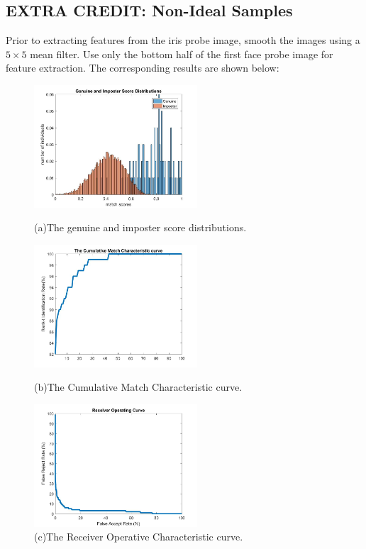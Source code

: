 \documentclass[a4paper]{article}
\begin{document}
\begin{spacing}{2.0}
\section*{\huge\textbf{ EXTRA CREDIT: Non-Ideal Samples}  }
	\normalsize  Prior to extracting features from the iris probe image, smooth the images using a $5\times 5$ mean filter. Use only the bottom half of the first face probe image for feature extraction. The corresponding results are shown below:
	\begin{figure}[H]
	\begin{minipage}[t]{0.3\linewidth}
	\centering
	\includegraphics[width=2.4in]{PartExtra3Dis.jpg}
	\caption{(a)The genuine and imposter score distributions.}
	\label{scoDis3}
	\end{minipage}
	\begin{minipage}[t]{0.3\linewidth}
	\centering
	\includegraphics[width=2.4in]{PartExtra3CMC.jpg}
	\caption{(b)The Cumulative Match Characteristic curve.}
	\label{CMC3}
	\end{minipage}
	\begin{minipage}[t]{0.3\linewidth}
	\centering
	\includegraphics[width=2.4in]{PartExtra3ROC.jpg}
	\caption{(c)The Receiver Operative Characteristic curve.}
	\label{ROC3}
	\end{minipage}
	\end{figure}
	

\end{spacing}
\end{document}
